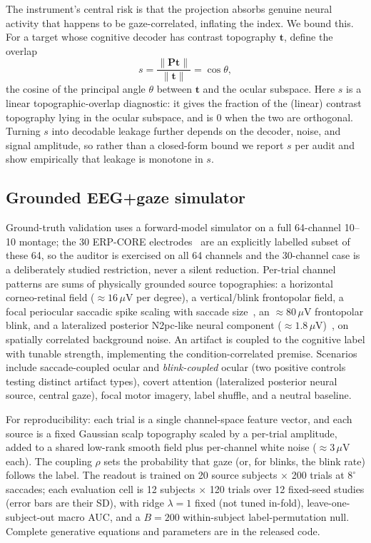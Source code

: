 \documentclass[conference]{IEEEtran}
\begin{document}
The instrument's central risk is that the projection absorbs genuine neural activity that
happens to be gaze-correlated, inflating the index. We bound this. For a target whose cognitive
decoder has contrast topography $\mathbf{t}$, define the overlap
\begin{equation}
s=\frac{\lVert\mathbf{P}\mathbf{t}\rVert}{\lVert\mathbf{t}\rVert}=\cos\theta,
\label{eq:overlap}
\end{equation}
the cosine of the principal angle $\theta$ between $\mathbf{t}$ and the ocular subspace. Here
$s$ is a linear topographic-overlap diagnostic: it gives the fraction of the (linear) contrast
topography lying in the ocular subspace, and is $0$ when the two are orthogonal. Turning $s$ into
decodable leakage further depends on the decoder, noise, and signal amplitude, so rather than a
closed-form bound we report $s$ per audit and show empirically that leakage is monotone in $s$.

\subsection{Grounded EEG+gaze simulator}

Ground-truth validation uses a forward-model simulator on a full 64-channel 10--10
montage; the 30 ERP-CORE electrodes~\cite{kappenman2021erpcore} are an explicitly labelled
subset of these 64, so the auditor is exercised on all 64 channels and
the 30-channel case is a deliberately studied restriction, never a silent reduction. Per-trial
channel patterns are sums of physically grounded source topographies: a horizontal corneo-retinal field ($\approx 16\,\mu$V per degree), a
vertical/blink frontopolar field, a focal periocular saccadic spike scaling with saccade
size~\cite{keren2010saccadic}, an $\approx 80\,\mu$V frontopolar blink, and a lateralized
posterior N2pc-like neural component ($\approx 1.8\,\mu$V)~\cite{luck1994n2pc}, on spatially
correlated background noise. An artifact is coupled to the cognitive label with tunable
strength, implementing the condition-correlated premise. Scenarios include saccade-coupled
ocular and \emph{blink-coupled} ocular (two positive controls testing distinct artifact types),
covert attention (lateralized posterior neural source, central gaze), focal motor imagery,
label shuffle, and a neutral baseline.

For reproducibility: each trial is a single channel-space feature vector, and each source is a
fixed Gaussian scalp topography scaled by a per-trial amplitude, added to a shared low-rank
smooth field plus per-channel white noise ($\approx 3\,\mu$V each). The coupling $\rho$ sets the
probability that gaze (or, for blinks, the blink rate) follows the label. The readout is trained
on 20 source subjects $\times$ 200 trials at $8^\circ$ saccades; each evaluation cell is 12
subjects $\times$ 120 trials over 12 fixed-seed studies (error bars are their SD), with ridge
$\lambda{=}1$ fixed (not tuned in-fold), leave-one-subject-out macro AUC, and a $B{=}200$
within-subject label-permutation null. Complete generative equations and parameters are in the
released code.
\end{document}
